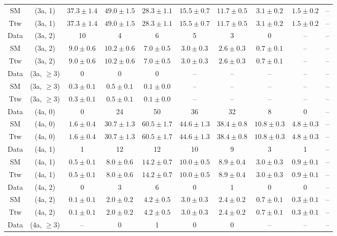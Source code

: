 \begin{table}[h!]
{\begin{tabular}{cccccccccc}
	SM & (3a, 1) & $37.3\pm 1.4$ & $49.0\pm 1.5$ & $28.3\pm 1.1$ & $15.5\pm 0.7$ & $11.7\pm 0.5$ & $3.1\pm 0.2$ & $1.5\pm 0.2$ & -- \\[0.5ex] 
	Ttw & (3a, 1) & $37.3\pm 1.4$ & $49.0\pm 1.5$ & $28.3\pm 1.1$ & $15.5\pm 0.7$ & $11.7\pm 0.5$ & $3.1\pm 0.2$ & $1.5\pm 0.2$ & -- \\[0.5ex] 
	Data & (3a, 2) & 10 & 4 & 6 & 5 & 3 & 0 & -- & -- \\[0.5ex] 
	SM & (3a, 2) & $9.0\pm 0.6$ & $10.2\pm 0.6$ & $7.0\pm 0.5$ & $3.0\pm 0.3$ & $2.6\pm 0.3$ & $0.7\pm 0.1$ & -- & -- \\[0.5ex] 
	Ttw & (3a, 2) & $9.0\pm 0.6$ & $10.2\pm 0.6$ & $7.0\pm 0.5$ & $3.0\pm 0.3$ & $2.6\pm 0.3$ & $0.7\pm 0.1$ & -- & -- \\[0.5ex] 
	Data & (3a, $\ge3$) & 0 & 0 & 0 & -- & -- & -- & -- & -- \\[0.5ex] 
	SM & (3a, $\ge3$) & $0.3\pm 0.1$ & $0.5\pm 0.1$ & $0.1\pm 0.0$ & -- & -- & -- & -- & -- \\[0.5ex] 
	Ttw & (3a, $\ge3$) & $0.3\pm 0.1$ & $0.5\pm 0.1$ & $0.1\pm 0.0$ & -- & -- & -- & -- & -- \\[0.5ex] 
	Data & (4a, 0) & 0 & 24 & 50 & 36 & 32 & 8 & 0 & -- \\[0.5ex] 
	SM & (4a, 0) & $1.6\pm 0.4$ & $30.7\pm 1.3$ & $60.5\pm 1.7$ & $44.6\pm 1.3$ & $38.4\pm 0.8$ & $10.8\pm 0.3$ & $4.8\pm 0.3$ & -- \\[0.5ex] 
	Ttw & (4a, 0) & $1.6\pm 0.4$ & $30.7\pm 1.3$ & $60.5\pm 1.7$ & $44.6\pm 1.3$ & $38.4\pm 0.8$ & $10.8\pm 0.3$ & $4.8\pm 0.3$ & -- \\[0.5ex] 
	Data & (4a, 1) & 1 & 12 & 12 & 10 & 9 & 3 & 1 & -- \\[0.5ex] 
	SM & (4a, 1) & $0.5\pm 0.1$ & $8.0\pm 0.6$ & $14.2\pm 0.7$ & $10.0\pm 0.5$ & $8.9\pm 0.4$ & $3.0\pm 0.3$ & $0.9\pm 0.1$ & -- \\[0.5ex] 
	Ttw & (4a, 1) & $0.5\pm 0.1$ & $8.0\pm 0.6$ & $14.2\pm 0.7$ & $10.0\pm 0.5$ & $8.9\pm 0.4$ & $3.0\pm 0.3$ & $0.9\pm 0.1$ & -- \\[0.5ex] 
	Data & (4a, 2) & 0 & 3 & 6 & 0 & 1 & 0 & 0 & -- \\[0.5ex] 
	SM & (4a, 2) & $0.1\pm 0.1$ & $2.0\pm 0.2$ & $4.2\pm 0.5$ & $3.0\pm 0.3$ & $2.4\pm 0.2$ & $0.7\pm 0.1$ & $0.3\pm 0.1$ & -- \\[0.5ex] 
	Ttw & (4a, 2) & $0.1\pm 0.1$ & $2.0\pm 0.2$ & $4.2\pm 0.5$ & $3.0\pm 0.3$ & $2.4\pm 0.2$ & $0.7\pm 0.1$ & $0.3\pm 0.1$ & -- \\[0.5ex] 
	Data & (4a, $\ge3$) & -- & 0 & 1 & 0 & 0 & -- & -- & -- \\[0.5ex] 

\end{tabular}}
\end{table}
